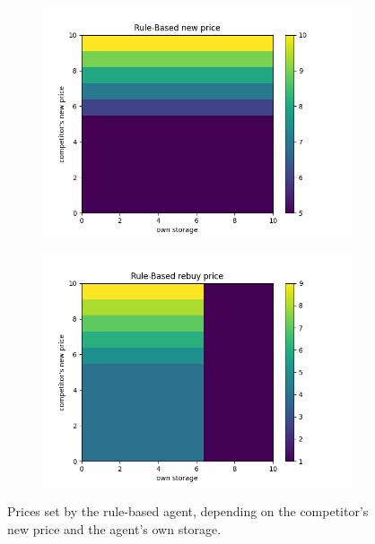 \begin{figure}[!t]
	\centering
	\begin{subfigure}{0.47\textwidth}
		\centering
		\includegraphics[width = \textwidth]{images/experiments/rulebased/policyanalyzer/RuleBasedPolicyanalyzerNewPrice.png}\\
		\label{fig:PolicyanalyserRuleBased1}
	\end{subfigure}
	\begin{subfigure}{0.47\textwidth}
		\centering
		\includegraphics[width = \textwidth]{images/experiments/rulebased/policyanalyzer/RuleBasedPolicyanalyzerRebuyPrice.png}\\
		\label{fig:PolicyanalyserRuleBased2}
	\end{subfigure}
	\caption{Prices set by the rule-based agent, depending on the competitor's new price and the agent's own storage.}\label{fig:PolicyanalyserRuleBased}
\end{figure}

